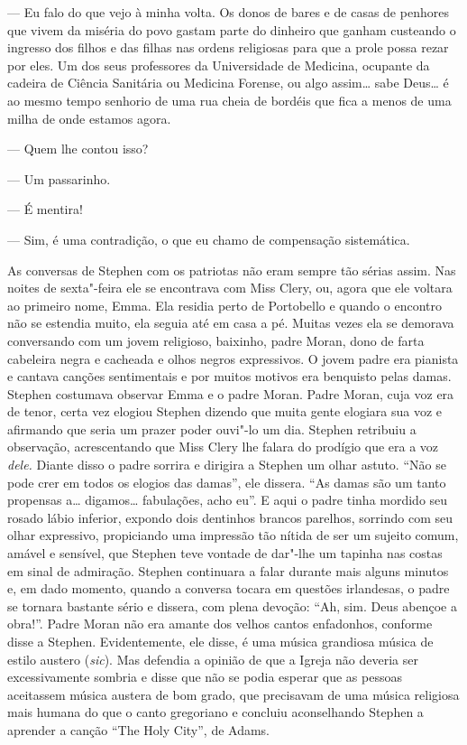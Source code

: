 --- Eu falo do que vejo à minha volta.  Os donos de bares e de
casas de penhores que vivem da miséria do povo gastam parte do dinheiro
que ganham custeando o ingresso dos filhos e das filhas nas ordens
religiosas para que a prole possa rezar por eles.  Um dos seus
professores da Universidade de Medicina, ocupante da cadeira de Ciência
Sanitária ou Medicina Forense, ou algo assim\ldots{} sabe Deus\ldots{} é ao mesmo
tempo senhorio de uma rua cheia de bordéis que fica a menos de uma
milha de onde estamos agora.

--- Quem lhe contou isso?

--- Um passarinho.

--- É mentira!

--- Sim, é uma contradição, o que eu chamo de compensação
sistemática.

As conversas de Stephen com os patriotas não eram sempre tão sérias
assim.  Nas noites de sexta"-feira ele se encontrava com Miss Clery, ou,
agora que ele voltara ao primeiro nome, Emma.  Ela residia perto de
Portobello e quando o encontro não se estendia muito, ela seguia até em
casa a pé.  Muitas vezes ela se demorava conversando com um jovem
religioso, baixinho, padre Moran, dono de farta cabeleira negra e
cacheada e olhos negros expressivos.  O jovem padre era pianista e
cantava canções sentimentais e por muitos motivos era benquisto pelas
damas.  Stephen costumava observar Emma e o padre Moran.  Padre Moran,
cuja voz era de tenor, certa vez elogiou Stephen dizendo que muita
gente elogiara sua voz e afirmando que seria um prazer poder ouvi"-lo um
dia.  Stephen retribuiu a observação, acrescentando que Miss Clery lhe
falara do prodígio que era a voz \textit{dele.}  Diante disso o padre
sorrira e dirigira a Stephen um olhar astuto.  “Não se pode crer em
todos os elogios das damas”, ele dissera.  “As damas são um tanto
propensas a\ldots{} digamos\ldots{} fabulações, acho eu”.  E aqui o padre tinha
mordido seu rosado lábio inferior, expondo dois dentinhos brancos
parelhos, sorrindo com seu olhar expressivo, propiciando uma impressão
tão nítida de ser um sujeito comum, amável e sensível, que Stephen teve
vontade de dar"-lhe um tapinha nas costas em sinal de admiração.
Stephen continuara a falar durante mais alguns minutos e, em dado
momento, quando a conversa tocara em questões irlandesas, o padre se
tornara bastante sério e dissera, com plena devoção: “Ah, sim.  \label{deus"-abencoe} Deus
abençoe a obra!”.  Padre Moran não era amante dos velhos cantos
enfadonhos, conforme disse a Stephen.  Evidentemente, ele disse, é uma
música grandiosa música de estilo austero (\textit{sic}).  Mas defendia		
a opinião de que a Igreja não deveria ser excessivamente sombria e		
disse que não se podia esperar que as pessoas aceitassem música austera
de bom grado, que precisavam de uma música religiosa mais humana do que
o canto gregoriano e concluiu aconselhando Stephen a aprender a canção
“The Holy City”, de Adams.


